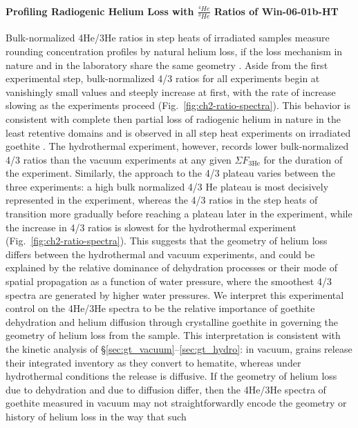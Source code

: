 \paragraph{Profiling Radiogenic Helium Loss with $\frac{^4He}{^3He}$ Ratios of Win-06-01b-HT}\label{spectra-of-win-06-01b-ht}

Bulk-normalized 4He/3He ratios in step heats of irradiated samples
measure rounding concentration profiles by natural helium loss, if the
loss mechanism in nature and in the laboratory share the same geometry
\citep{shuster2004,farley2024}. Aside from the first
experimental step, bulk-normalized 4/3 ratios for all experiments begin
at vanishingly small values and steeply increase at first, with the rate
of increase slowing as the experiments proceed (Fig.~\ref{fig:ch2-ratio-spectra}). This
behavior is consistent with complete then partial loss of radiogenic
helium in nature in the least retentive domains and is observed in all
step heat experiments on irradiated goethite \citep{farley2024}. The
hydrothermal experiment, however, records lower bulk-normalized 4/3
ratios than the vacuum experiments at any given $\Sigma F_{3\mathrm{He}}$ for the duration
of the experiment. Similarly, the approach to the 4/3 plateau varies
between the three experiments: a high bulk normalized 4/3 He plateau is
most decisively represented in the \citet{farley2024} experiment,
whereas the 4/3 ratios in the step heats of \citet{monteiro2017} transition
more gradually before reaching a plateau later in the experiment, while
the increase in 4/3 ratios is slowest for the hydrothermal experiment
(Fig.~\ref{fig:ch2-ratio-spectra}). This suggests that the geometry of helium loss
differs between the hydrothermal and vacuum experiments, and could be explained by the relative
dominance of dehydration processes or their mode of spatial propagation as a
function of water pressure, where the smoothest 4/3 spectra are
generated by higher water pressures. We interpret this experimental control on the
4He/3He spectra to be the relative importance of goethite dehydration and helium
diffusion through crystalline goethite in governing the geometry of helium loss from
the sample. This interpretation is consistent with the kinetic analysis of
\S\ref{sec:gt_vacuum}--\ref{sec:gt_hydro}: in vacuum, grains release their integrated
inventory as they convert to hematite, whereas under hydrothermal conditions the release is
diffusive. If the geometry of helium loss due to dehydration and due to diffusion
differ, then the 4He/3He spectra of goethite measured in vacuum may not
straightforwardly encode the geometry or history of helium loss in the way that such
